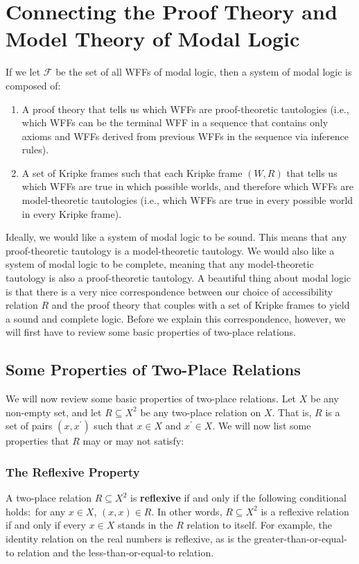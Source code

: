\documentclass[11pt]{article}
\theoremstyle{definition}
\theoremstyle{remark}
\begin{document}
\section{Connecting the Proof Theory and Model Theory of Modal Logic}
If we let $\mathcal{F}$ be the set of all WFFs of modal logic, then a system of modal logic is composed of:
\begin{enumerate}
    \item A proof theory that tells us which WFFs are proof-theoretic tautologies (i.e., which WFFs can be the terminal WFF in a sequence that contains only axioms and WFFs derived from previous WFFs in the sequence via inference rules).

    \item A set of Kripke frames such that each Kripke frame $(W,R)$ that tells us which WFFs are true in which possible worlds, and therefore which WFFs are model-theoretic tautologies (i.e., which WFFs are true in every possible world in every Kripke frame).
\end{enumerate}
Ideally, we would like a system of modal logic to be sound. This means that any proof-theoretic tautology is a model-theoretic tautology. We would also like a system of modal logic to be complete, meaning that any model-theoretic tautology is also a proof-theoretic tautology. A beautiful thing about modal logic is that there is a very nice correspondence between our choice of accessibility relation $R$ and the proof theory that couples with a set of Kripke frames to yield a sound and complete logic. Before we explain this correspondence, however, we will first have to review some basic properties of two-place relations.\par 

\subsection{Some Properties of Two-Place Relations}
We will now review some basic properties of two-place relations. Let $X$ be any non-empty set, and let $R\subseteq X^{2}$ be any two-place relation on $X$. That is, $R$ is a set of pairs $(x,x^{\prime})$ such that $x\in X$ and $x^{\prime}\in X$. We will now list some properties that $R$ may or may not satisfy:

\subsubsection{The Reflexive Property}
A two-place relation $R\subseteq X^{2}$ is \textbf{reflexive} if and only if the following conditional holds:\ for any $x\in X$, $(x,x)\in R$. In other words, $R\subseteq X^{2}$ is a reflexive relation if and only if every $x\in X$ stands in the $R$ relation to itself. For example, the identity relation on the real numbers is reflexive, as is the greater-than-or-equal-to relation and the less-than-or-equal-to relation.
\end{document}
